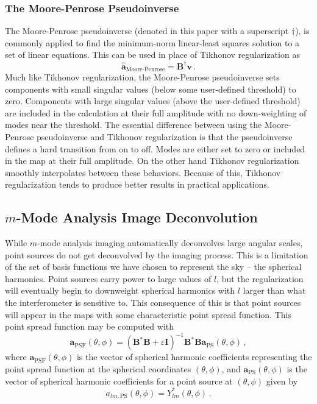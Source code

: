 \documentclass[twocolumn]{aastex6}
\renewcommand{\b}{\pmb}
\begin{document}
\subsubsection{The Moore-Penrose Pseudoinverse}

The Moore-Penrose pseudoinverse (denoted in this paper with a superscript $\dagger$), is commonly
applied to find the minimum-norm linear-least squares solution to a set of linear equations. This
can be used in place of Tikhonov regularization as
\begin{equation}
    \b{\hat a}_\text{Moore-Penrose} = \b B^\dagger\b v\,.
\end{equation}
Much like Tikhonov regularization, the Moore-Penrose pseudoinverse sets components with small
singular values (below some user-defined threshold) to zero. Components with large singular values
(above the user-defined threshold) are included in the calculation at their full amplitude with no
down-weighting of modes near the threshold. The essential difference between using the Moore-Penrose
pseudoinverse and Tikhonov regularization is that the pseudoinverse defines a hard transition from
on to off. Modes are either set to zero or included in the map at their full amplitude. On the other
hand Tikhonov regularization smoothly interpolates between these behaviors. Because of this,
Tikhonov regularization tends to produce better results in practical applications.

\subsection{$m$-Mode Analysis Image Deconvolution}

While $m$-mode analysis imaging automatically deconvolves large angular scales, point sources do not
get deconvolved by the imaging process. This is a limitation of the set of basis functions we have
chosen to represent the sky -- the spherical harmonics. Point sources carry power to large values of
$l$, but the regularization will eventually begin to downweight spherical harmonics with $l$ larger
than what the interferometer is sensitive to. This consequence of this is that point sources will
appear in the maps with some characteristic point spread function. This point spread function may be
computed with
\begin{equation}
    \b a_\text{PSF}(\theta, \phi)
        = (\b B^*\b B + \varepsilon\b I)^{-1}\b B^*\b B\b a_\text{PS}(\theta, \phi)\,,
\end{equation}
where $\b a_\text{PSF}(\theta, \phi)$ is the vector of spherical harmonic coefficients representing
the point spread function at the spherical coordinates $(\theta, \phi)$, and $\b a_\text{PS}(\theta,
\phi)$ is the vector of spherical harmonic coefficients for a point source at $(\theta, \phi)$ given
by
\begin{equation}
    a_{lm, \text{PS}}(\theta, \phi) = Y_{lm}^*(\theta, \phi)\,.
\end{equation}
\end{document}
